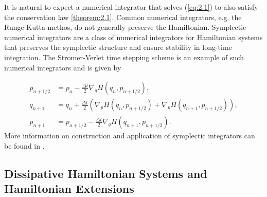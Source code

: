 It is natural to expect a numerical integrator that solves (\ref{eq:2.1}) to also satisfy the conservation law \ref{theorem:2.1}. Common numerical integrators, e.g. the Runge-Kutta methos, do not generally preserve the Hamiltonian. Symplectic numerical integrators are a class of numerical integrators for Hamiltonian systems that preserves the symplectic structure and ensure stability in long-time integration. The Str\:omer-Verlet time stepping scheme is an example of such numerical integrators and is given by

\begin{equation} \label{eq:2.2}
\begin{aligned}
	p_{n+1/2} &= p_n - \frac{\Delta t}{2} \nabla_qH(q_{n},p_{n+1/2}), \\
	q_{n+1} &= q_n + \frac{\Delta t}{2} \left( \nabla_pH(q_{n},p_{n+1/2}) + \nabla_pH(q_{n+1},p_{n+1/2}) \right),\\
	p_{n+1} &= p_{n+1/2} - \frac{\Delta t}{2} \nabla_qH(q_{n+1},p_{n+1/2}).
\end{aligned}
\end{equation}
More information on construction and application of symplectic integrators can be found in \cite{Hairer:1250576}.

\subsection{Dissipative Hamiltonian Systems and Hamiltonian Extensions}
